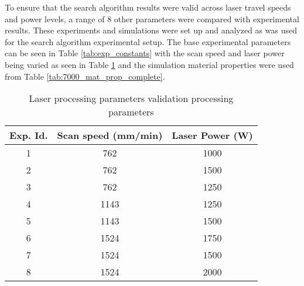 \label{validation}

To ensure that the search algorithm results were valid across laser travel speeds and power levels, a range of 8 other parameters were compared with experimental results.
These experiments and simulations were set up and analyzed as was used for the search algorithm experimental setup.  The base experimental parameters can be seen in Table \ref{tab:exp_constants} with the scan speed and laser power being varied as seen in Table \ref{tab:val_parameters} and the simulation material properties were used from Table \ref{tab:7000_mat_prop_complete}.
\begin{table}[!htb]
	\centering
	\caption{Laser processing parameters validation processing parameters}
	\label{tab:val_parameters}
		\begin{tabular}{|c|c|c|} \hline 
			Exp. Id. & Scan speed (mm/min) & Laser Power (W) \\ \hline
			1 & 762 & 1000 \\ \hline  %
			2 & 762 & 1500 \\ \hline  %
			3 & 762 & 1250 \\ \hline  %
			4 & 1143 & 1250 \\ \hline %
			5 & 1143 & 1500 \\ \hline  %
			6 & 1524 & 1750 \\ \hline  %
			7 & 1524 & 1500 \\ \hline  %
			8 & 1524 & 2000 \\ \hline  %
		\end{tabular}
\end{table}

